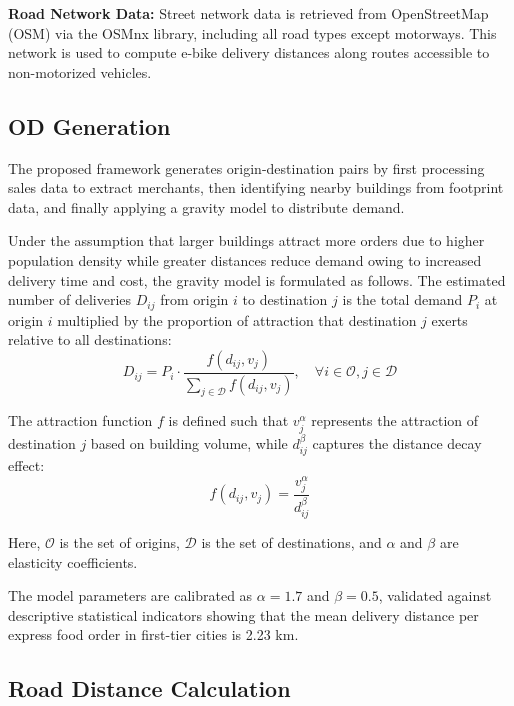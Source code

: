 \documentclass[11pt]{article}
\begin{document}
\textbf{Road Network Data:} Street network data is retrieved from OpenStreetMap (OSM) via the OSMnx library, including all road types except motorways. This network is used to compute e-bike delivery distances along routes accessible to non-motorized vehicles.

\subsection{OD Generation}

The proposed framework generates origin-destination pairs by first processing sales data to extract merchants, then identifying nearby buildings from footprint data, and finally applying a gravity model to distribute demand.

Under the assumption that larger buildings attract more orders due to higher population density while greater distances reduce demand owing to increased delivery time and cost, the gravity model is formulated as follows. The estimated number of deliveries $D_{ij}$ from origin $i$ to destination $j$ is the total demand $P_i$ at origin $i$ multiplied by the proportion of attraction that destination $j$ exerts relative to all destinations:
\begin{equation}
  D_{ij} = P_{i} \cdot \frac{f(d_{ij}, v_{j})}{\sum_{j \in \mathcal{D}} f(d_{ij}, v_{j})}, \quad \forall i \in \mathcal{O}, j \in \mathcal{D}
\end{equation}

The attraction function $f$ is defined such that $v_j^\alpha$ represents the attraction of destination $j$ based on building volume, while $d_{ij}^\beta$ captures the distance decay effect:
\begin{equation}
  f(d_{ij}, v_{j}) = \frac{v_{j}^\alpha}{d_{ij}^{\beta}}
\end{equation}

Here, $\mathcal{O}$ is the set of origins, $\mathcal{D}$ is the set of destinations, and $\alpha$ and $\beta$ are elasticity coefficients.

The model parameters are calibrated as $\alpha = 1.7$ and $\beta = 0.5$, validated against descriptive statistical indicators showing that the mean delivery distance per express food order in first-tier cities is 2.23 km.

\subsection{Road Distance Calculation}
\end{document}
